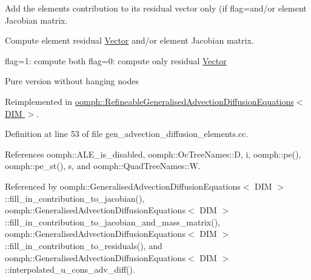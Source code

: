 Add the element\textquotesingle{}s contribution to its residual vector only (if flag=and/or element Jacobian matrix. 

Compute element residual \hyperlink{classoomph_1_1Vector}{Vector} and/or element Jacobian matrix.

flag=1\+: compute both flag=0\+: compute only residual \hyperlink{classoomph_1_1Vector}{Vector}

Pure version without hanging nodes 

Reimplemented in \hyperlink{classoomph_1_1RefineableGeneralisedAdvectionDiffusionEquations_abd0535533c7133651ac18ad8e025f139}{oomph\+::\+Refineable\+Generalised\+Advection\+Diffusion\+Equations$<$ D\+I\+M $>$}.



Definition at line 53 of file gen\+\_\+advection\+\_\+diffusion\+\_\+elements.\+cc.



References oomph\+::\+A\+L\+E\+\_\+is\+\_\+disabled, oomph\+::\+Oc\+Tree\+Names\+::D, i, oomph\+::pe(), oomph\+::pe\+\_\+st(), s, and oomph\+::\+Quad\+Tree\+Names\+::W.



Referenced by oomph\+::\+Generalised\+Advection\+Diffusion\+Equations$<$ D\+I\+M $>$\+::fill\+\_\+in\+\_\+contribution\+\_\+to\+\_\+jacobian(), oomph\+::\+Generalised\+Advection\+Diffusion\+Equations$<$ D\+I\+M $>$\+::fill\+\_\+in\+\_\+contribution\+\_\+to\+\_\+jacobian\+\_\+and\+\_\+mass\+\_\+matrix(), oomph\+::\+Generalised\+Advection\+Diffusion\+Equations$<$ D\+I\+M $>$\+::fill\+\_\+in\+\_\+contribution\+\_\+to\+\_\+residuals(), and oomph\+::\+Generalised\+Advection\+Diffusion\+Equations$<$ D\+I\+M $>$\+::interpolated\+\_\+u\+\_\+cons\+\_\+adv\+\_\+diff().

\mbox{\label{classoomph_1_1GeneralisedAdvectionDiffusionEquations_aff553670fb9ced08f958005b611f80cb}} 
